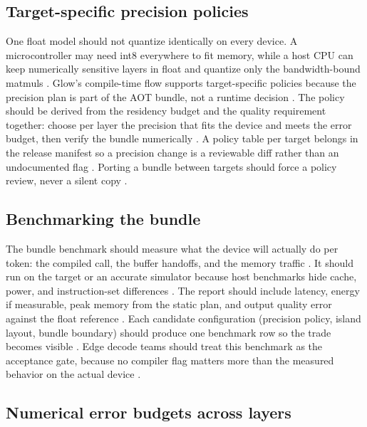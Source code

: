 \subsection{Target-specific precision policies}

One float model should not quantize identically on every device. A microcontroller may need int8 everywhere to fit memory, while a host CPU can keep numerically sensitive layers in float and quantize only the bandwidth-bound matmuls \citep{rotem2018glow,dlbook,amd2024aie}. Glow's compile-time flow supports target-specific policies because the precision plan is part of the AOT bundle, not a runtime decision \citep{pytorchglow2024,rotem2018glow}. The policy should be derived from the residency budget and the quality requirement together: choose per layer the precision that fits the device and meets the error budget, then verify the bundle numerically \citep{dao2022flashattention,patel2025llminference}. A policy table per target belongs in the release manifest so a precision change is a reviewable diff rather than an undocumented flag \citep{chen2020compilerbasedhardw,memoryfloor2026}. Porting a bundle between targets should force a policy review, never a silent copy \citep{rotem2018glow,taxbreak2026}.

\subsection{Benchmarking the bundle}

The bundle benchmark should measure what the device will actually do per token: the compiled call, the buffer handoffs, and the memory traffic \citep{taxbreak2026,patel2025llminference}. It should run on the target or an accurate simulator because host benchmarks hide cache, power, and instruction-set differences \citep{dlbook,memoryfloor2026}. The report should include latency, energy if measurable, peak memory from the static plan, and output quality error against the float reference \citep{rotem2018glow,patel2025llminference}. Each candidate configuration (precision policy, island layout, bundle boundary) should produce one benchmark row so the trade becomes visible \citep{chen2020compilerbasedhardw,taxbreak2026}. Edge decode teams should treat this benchmark as the acceptance gate, because no compiler flag matters more than the measured behavior on the actual device \citep{memoryfloor2026,rotem2018glow}.

\subsection{Numerical error budgets across layers}

